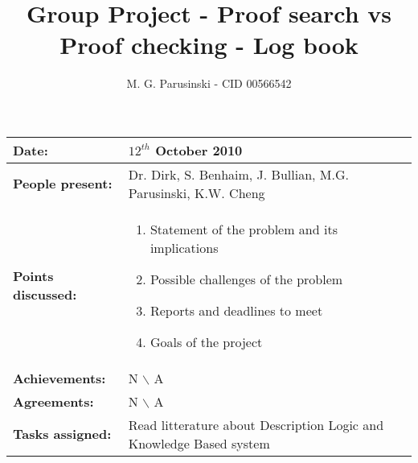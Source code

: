 \documentclass[12pt,a4paper]{article}
\title{Group Project - Proof search vs Proof checking - Log book}
\author{M. G. Parusinski - CID 00566542}
\newcommand{\meeting}[6]{%
\begin{center}%
\begin{longtable}{| p{3.5cm}  | p{13cm} |}%
\hline%
\textbf{Date:} & #1 \\%
\hline%
\textbf{People present:} &#2 \\%
\hline%
\textbf{Points discussed:} &#3\\%
\hline%
\textbf{Achievements:} &#4 \\%
\hline%
\textbf{Agreements:} &#5 \\%
\hline%
\textbf{Tasks assigned:} &#6  \\%
\hline%
\end{longtable}%
\end{center}%
\bigbreak
}
\begin{document}
\maketitle

\meeting{$12^{th}$ October 2010}%
{Dr. Dirk, S. Benhaim, J. Bullian, M.G. Parusinski, K.W. Cheng}%
{ \begin{enumerate} \item Statement of the problem and its implications 
 \item Possible challenges of the problem 
 \item Reports and deadlines to meet 
 \item Goals of the project 
\end{enumerate} }%
{ N $\backslash$ A}%
{ N $\backslash$ A}%
{ Read litterature about Description Logic and Knowledge Based system}
\end{document}
